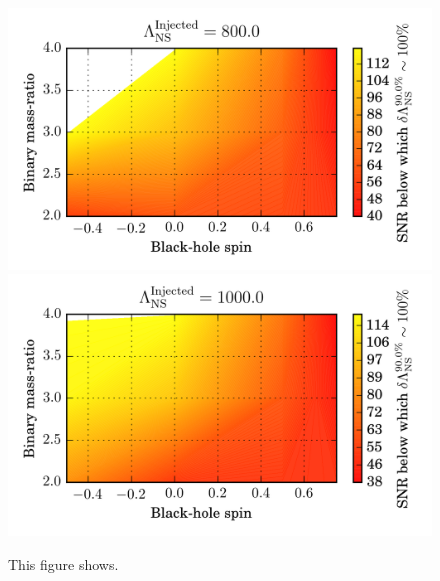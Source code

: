\documentclass[aps,prd,amsmath,floats,floatfix, twocolumn,
superscriptaddress,nofootinbib,showpacs]{revtex4-1}
\begin{document}
\begin{figure}
\includegraphics[width=.65\columnwidth]{plots-TT/TT_SNRThresholdForLambdaMeasurement_BHspin_MassRatio_Lambda800_0_CI90_0.png}
\includegraphics[width=.65\columnwidth]{plots-TT/TT_SNRThresholdForLambdaMeasurement_BHspin_MassRatio_Lambda1000_0_CI90_0.png}
\caption{This figure shows.}
\label{fig:TT_SNRThresholdForLambdaMeasurement_BHspin_MassRatio_CI90_0}
\end{figure}
\end{document}
